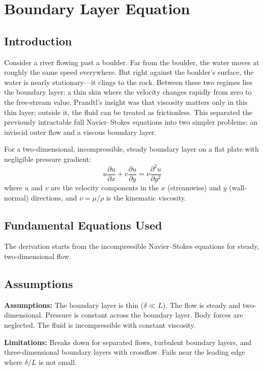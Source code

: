 \chapter{Boundary Layer Equation}

\section*{Introduction}

Consider a river flowing past a boulder. Far from the boulder, the water moves at roughly the same speed everywhere. But right against the boulder's surface, the water is nearly stationary---it clings to the rock. Between these two regimes lies the boundary layer: a thin skin where the velocity changes rapidly from zero to the free-stream value. Prandtl's insight was that viscosity matters only in this thin layer; outside it, the fluid can be treated as frictionless. This separated the previously intractable full Navier--Stokes equations into two simpler problems: an inviscid outer flow and a viscous boundary layer.


For a two-dimensional, incompressible, steady boundary layer on a flat plate with negligible pressure gradient:
\[
u\frac{\partial u}{\partial x} + v\frac{\partial u}{\partial y} = \nu \frac{\partial^2 u}{\partial y^2}
\]
where $u$ and $v$ are the velocity components in the $x$ (streamwise) and $y$ (wall-normal) directions, and $\nu = \mu/\rho$ is the kinematic viscosity.

\section*{Fundamental Equations Used}

The derivation starts from the incompressible Navier--Stokes equations for steady, two-dimensional flow.

\section*{Assumptions}

\textbf{Assumptions:} The boundary layer is thin ($\delta \ll L$). The flow is steady and two-dimensional. Pressure is constant across the boundary layer. Body forces are neglected. The fluid is incompressible with constant viscosity.


\textbf{Limitations:} Breaks down for separated flows, turbulent boundary layers, and three-dimensional boundary layers with crossflow. Fails near the leading edge where $\delta/L$ is not small.


